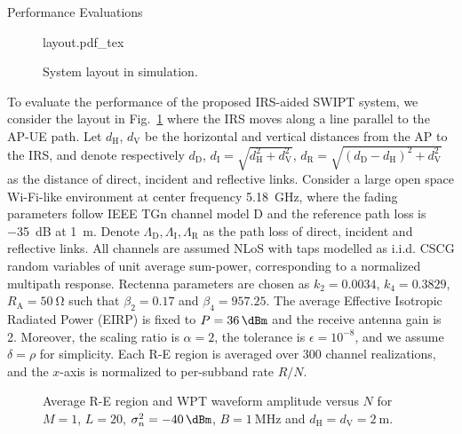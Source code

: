 \documentclass[journal]{IEEEtran}
\begin{document}
	\begin{section}{Performance Evaluations}\label{se:performance_evaluation}
		\begin{figure}[!t]
			\centering
			\def\svgwidth{0.9\columnwidth}
			{layout.pdf_tex}
			\caption{System layout in simulation.}
			\label{fi:layout}
		\end{figure}

		To evaluate the performance of the proposed IRS-aided SWIPT system, we consider the layout in Fig.~\ref{fi:layout} where the IRS moves along a line parallel to the AP-UE path. Let $d_{\mathrm{H}}$, $d_{\mathrm{V}}$ be the horizontal and vertical distances from the AP to the IRS, and denote respectively $d_{\mathrm{D}}$, $d_{\mathrm{I}}=\sqrt{d_{\mathrm{H}}^2+d_{\mathrm{V}}^2}$, $d_{\mathrm{R}}=\sqrt{(d_{\mathrm{D}}-d_{\mathrm{H}})^2+d_{\mathrm{V}}^2}$ as the distance of direct, incident and reflective links. Consider a large open space Wi-Fi-like environment at center frequency \SI{5.18}{\GHz}, where the fading parameters follow IEEE TGn channel model D \cite{Erceg2004} and the reference path loss is \SI{-35}{\dB} at \SI{1}{\meter}. Denote $\Lambda_{\mathrm{D}},\Lambda_{\mathrm{I}},\Lambda_{\mathrm{R}}$ as the path loss of direct, incident and reflective links. All channels are assumed NLoS with taps modelled as i.i.d. CSCG random variables of unit average sum-power, corresponding to a normalized multipath response. Rectenna parameters are chosen as $k_2=0.0034$, $k_4=0.3829$, $R_{\mathrm{A}}=\SI{50}{\ohm}$ such that $\beta_2=0.17$ and $\beta_4=957.25$. The average Effective Isotropic Radiated Power (EIRP) is fixed to $P=\SI{36}{\dBm}$ and the receive antenna gain is \SI{2}{\dBi}. Moreover, the scaling ratio is $\alpha=2$, the tolerance is $\epsilon=10^{-8}$, and we assume $\delta=\rho$ for simplicity. Each R-E region is averaged over \num{300} channel realizations, and the $x$-axis is normalized to per-subband rate $R/N$.

		\begin{figure}[!t]
			\centering
			\caption{Average R-E region and WPT waveform amplitude versus $N$ for $M=1$, $L=20$, $\sigma_n^2=\SI{-40}{\dBm}$, $B=\SI{1}{\MHz}$ and $d_{\mathrm{H}}=d_{\mathrm{V}}=\SI{2}{\meter}$.}
		\end{figure}


\end{section}
\end{document}
